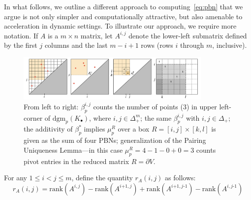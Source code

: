 \documentclass[10pt]{article}
\numberwithin{equation}{section}
\newcommand{\+}{%
	\raisebox{0.18ex}{\scaleobj{0.55}{+}}
}
\theoremstyle{definition}
\begin{document}
In what follows, we outline a different approach to computing~\eqref{eq:pbn} that we argue is not only simpler and computationally attractive, but also amenable to acceleration in dynamic settings. 
To illustrate our approach, we require more notation. If $A$ is a $m \times n$ matrix, let $A^{i, j}$ denote the lower-left submatrix defined by the first $j$ columns and the last $m - i + 1$ rows (rows $i$ through $m$, inclusive). 
\begin{figure}
\centering
	\includegraphics[width=0.85\textwidth]{betti_add}
	\caption{From left to right: $\beta_p^{i,j}$ counts the number of points (3) in upper left-corner of $\mathrm{dgm}_p(K_\bullet)$, where $i,j \in \Delta_+^m$; the same $\beta_p^{i,j}$  with $i,j \in \Delta_+$; the additivity of $\beta_p^{\ast}$ implies $\mu_p^{R}$ over a box $R=[i,j] \times [k,l]$ is given as the sum of four PBNs; generalization of the Pairing Uniqueness Lemma---in this case 	$\mu_p^R = 4 - 1 - 0 + 0 = 3$ counts pivot entries in the reduced matrix $R = \partial V$.}
	\label{fig:mult}
\end{figure}
For any $1 \leq i < j \leq m$, define the quantity $r_A(i,j)$ as follows:
\begin{equation}
	r_A(i,j) = \mathrm{rank}(A^{i,j}) - \mathrm{rank}(A^{i\texttt{+}1,j}) + \mathrm{rank}(A^{i\texttt{+}1,j\text{-}1}) - \mathrm{rank}(A^{i,j\text{-}1})
\end{equation}
\end{document}
